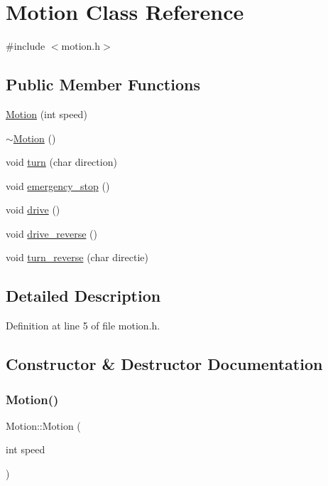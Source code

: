 \hypertarget{class_motion}{}\section{Motion Class Reference}
\label{class_motion}


{\ttfamily \#include $<$motion.\+h$>$}

\subsection*{Public Member Functions}
\begin{DoxyCompactItemize}
\item 
\mbox{\hyperlink{class_motion_a3ac2f89dcb6ec279fa36ed38b12be3b4}{Motion}} (int speed)
\item 
\mbox{\hyperlink{class_motion_a3989871f9b2b9b69c88b5437b40a72c6}{$\sim$\+Motion}} ()
\item 
void \mbox{\hyperlink{class_motion_af922ccbd27054420dd1ff679d48f588d}{turn}} (char direction)
\item 
void \mbox{\hyperlink{class_motion_a44ce916fa9aad6277f0990b14a4259ef}{emergency\+\_\+stop}} ()
\item 
void \mbox{\hyperlink{class_motion_a343e5cef901d8309b64735b3a0923728}{drive}} ()
\item 
void \mbox{\hyperlink{class_motion_a3bc12224ab575f75c71054d547ae0add}{drive\+\_\+reverse}} ()
\item 
void \mbox{\hyperlink{class_motion_a73524a9eb0bf44b4956622fcea759fd0}{turn\+\_\+reverse}} (char directie)
\end{DoxyCompactItemize}


\subsection{Detailed Description}


Definition at line 5 of file motion.\+h.



\subsection{Constructor \& Destructor Documentation}
\mbox{\label{class_motion_a3ac2f89dcb6ec279fa36ed38b12be3b4}} 
\subsubsection{\texorpdfstring{Motion()}{Motion()}}
{\footnotesize\ttfamily Motion\+::\+Motion (\begin{DoxyParamCaption}\item[{int}]{speed }\end{DoxyParamCaption})}



